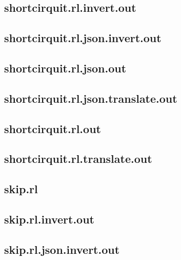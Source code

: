 \subsection{shortcirquit.rl.invert.out}
\label{app:shortcirquit_rl.invert.out}

\subsection{shortcirquit.rl.json.invert.out}
\label{app:shortcirquit_rl.json.invert.out}

\subsection{shortcirquit.rl.json.out}
\label{app:shortcirquit_rl.json.out}

\subsection{shortcirquit.rl.json.translate.out}
\label{app:shortcirquit_rl.json.translate.out}

\subsection{shortcirquit.rl.out}
\label{app:shortcirquit_rl.out}

\subsection{shortcirquit.rl.translate.out}
\label{app:shortcirquit_rl.translate.out}

\subsection{skip.rl}
\label{app:skip_rl}

\subsection{skip.rl.invert.out}
\label{app:skip_rl.invert.out}

\subsection{skip.rl.json.invert.out}
\label{app:skip_rl.json.invert.out}

